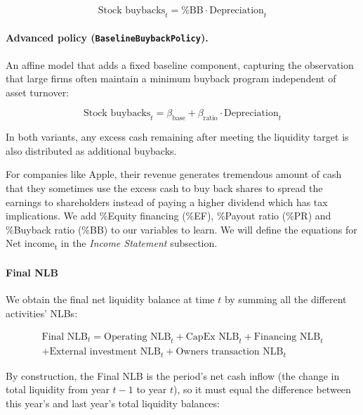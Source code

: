 \documentclass[12pt,a4paper]{article}
\begin{document}
\begin{equation}\label{eq:stock_buybacks}
\text{Stock buybacks}_t = \text{\%BB} \cdot \text{Depreciation}_t
\end{equation}

\paragraph{Advanced policy (\texttt{BaselineBuybackPolicy}).}
An affine model that adds a fixed baseline component, capturing the
observation that large firms often maintain a minimum buyback program
independent of asset turnover:

\begin{equation}\label{eq:stock_buybacks_advanced}
\text{Stock buybacks}_t = \beta_{\text{base}} + \beta_{\text{ratio}} \cdot \text{Depreciation}_t
\end{equation}

In both variants, any excess cash remaining after meeting the liquidity
target is also distributed as additional buybacks.

For companies like Apple, their revenue generates tremendous amount of
cash that they sometimes use the excess cash to buy back shares to
spread the earnings to shareholders instead of paying a higher dividend
which has tax implications. We add \%Equity financing (\%EF), \%Payout
ratio (\%PR) and \%Buyback ratio (\%BB) to our variables to learn. We
will define the equations for Net income\textsubscript{t} in the
\emph{Income Statement} subsection.

\paragraph{Final NLB}

We obtain the final net liquidity balance at time $t$ by summing
all the different activities' NLBs:

\begin{multline}\label{eq:final_nlb}
\text{Final NLB}_t = \text{Operating NLB}_t + \text{CapEx NLB}_t + \text{Financing NLB}_t \\
+ \text{External investment NLB}_t + \text{Owners transaction NLB}_t
\end{multline}

By construction, the Final NLB is the period's net cash inflow (the
change in total liquidity from year $t-1$ to year $t$), so it must
equal the difference between this year's and last year's total
liquidity balances:
\end{document}
